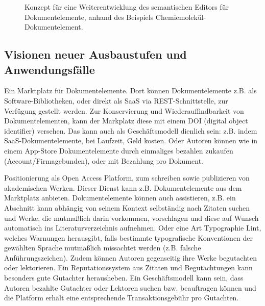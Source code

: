  
\begin{figure}[h!]
\centering
\advance\leftskip-2.5cm
\caption{ Konzept für eine Weiterentwicklung des semantischen Editors für Dokumentelemente, anhand des Beispiels Chemiemolekül-Dokumentelement. }\label{semanticeditor}
\end{figure}
 
\subsection{Visionen neuer Ausbaustufen und Anwendungsfälle}\label{}
 
Ein Marktplatz für Dokumentelemente. Dort können Dokumentelemente z.B. als Software-Bibliotheken, oder direkt als SaaS via REST-Schnittstelle, zur Verfügung gestellt werden. Zur Konservierung und Wiederauffindbarkeit von Dokumentelementen, kann der Markplatz diese mit einem DOI (digital object identifier) versehen. Das kann auch als Geschäftsmodell dienlich sein: z.B. indem SaaS-Dokumentelemente, bei Laufzeit, Geld kosten. Oder Autoren können wie in einem App-Store Dokumentelemente durch einmaliges bezahlen zukaufen (Account/Firmagebunden), oder mit Bezahlung pro Dokument.

 
Positionierung als Open Access Platform, zum schreiben sowie publizieren von akademischen Werken. Dieser Dienst kann z.B. Dokumentelemente aus dem Marktplatz anbieten. Dokumentelemente können auch assistieren, z.B. ein Abschnitt kann abhängig von seinem Kontext selbständig nach Zitaten suchen und Werke, die mutmaßlich darin vorkommen, vorschlagen und diese auf Wunsch automatisch ins Literaturverzeichnis aufnehmen. Oder eine Art Typographie Lint, welches Warnungen herausgibt, falls bestimmte typografische Konventionen der gewählten Sprache mutmaßlich missachtet werden (z.B. falsche Anführungszeichen). Zudem können Autoren gegenseitig ihre Werke begutachten oder lektorieren. Ein Reputationssystem aus Zitaten und Begutachtungen kann besonders gute Gutachter herausheben. Ein Geschäftsmodell kann sein, dass Autoren bezahlte Gutachter oder Lektoren suchen bzw. beauftragen können und die Platform erhält eine entsprechende Transaktionsgebühr pro Gutachten.


